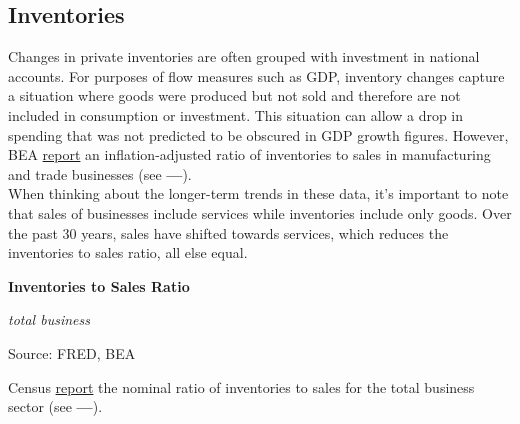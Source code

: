 \documentclass{report}
\makeatletter
\newcommand{\tbllink}[1]{\href{https://raw.githubusercontent.com/bdecon/US-chartbook/master/chartbook/data/#1}{\faTable}}
\newcommand*\short[1]{\expandafter\@gobbletwo\number\numexpr#1\relax}
\newcommand{\shdateaxisticks}{
		date coordinates in=x, axis line style={draw=none},
		xmax={2020-11-15},
		max space between ticks=40,	    
		xtick={{1990-01-01}, {1995-01-01}, {2000-01-01}, 
			{2005-01-01}, {2010-01-01}, {2015-01-01}, {2020-01-01}},
		minor xtick={},
		enlarge y limits={0.06}, enlarge x limits={0.01},
		}
\newcommand{\stdline}[4]{\addplot[very thick, no markers, color=#1] 
		table [x=#2, y=#3, col sep=comma] {#4};	}
\newcommand{\rbars}{
		\fill[color=black!10] (axis cs:{1990-07-01},\pgfkeysvalueof{/pgfplots/ymin}) rectangle 
			(axis cs:{1991-03-01}, \pgfkeysvalueof{/pgfplots/ymax});
		\fill[color=black!10] (axis cs:{2007-12-01},\pgfkeysvalueof{/pgfplots/ymin}) rectangle 
			(axis cs:{2009-07-01}, \pgfkeysvalueof{/pgfplots/ymax});
		\fill[color=black!10] (axis cs:{2001-03-01},\pgfkeysvalueof{/pgfplots/ymin}) rectangle 
			(axis cs:{2001-11-01}, \pgfkeysvalueof{/pgfplots/ymax});
		\fill[color=black!10] (axis cs:{2020-02-01},\pgfkeysvalueof{/pgfplots/ymin}) rectangle 
			(axis cs:{2020-10-01}, \pgfkeysvalueof{/pgfplots/ymax});}
\makeatother
\begin{document}
{{{{\subsection*{\color{black!70} \seriffont Inventories}
\begin{minipage}{0.76\textwidth}
\small Changes in private inventories are often grouped with investment in national accounts. For purposes of flow measures such as GDP, inventory changes capture a situation where goods were produced but not sold and therefore are not included in consumption or investment. This situation can allow a drop in spending that was not predicted to be obscured in GDP growth figures. However, BEA \href{https://apps.bea.gov/iTable/index_UD.cfm}{report} an inflation-adjusted ratio of inventories to sales in manufacturing and trade businesses (see {\color{blue!60!green}\textbf{---}}). \\

When thinking about the longer-term trends in these data, it's important to note that sales of businesses include services while inventories include only goods. Over the past 30 years, sales have shifted towards services, which reduces the inventories to sales ratio, all else equal. 

\end{minipage}
\vspace{1mm}

\begin{minipage}{0.4\textwidth}
\normalsize \textbf{Inventories to Sales Ratio}

\footnotesize{\textit{total business}}
 
\hspace*{-2mm} 

\footnotesize{Source: FRED, BEA} \hfill \tbllink{isratio.csv}

\end{minipage} \hspace{8mm}
\begin{minipage}{0.31\textwidth}
\small Census \href{https://www.census.gov/mtis/www/data/pdf/mtis_current.pdf}{report} the nominal ratio of inventories to sales for the total business sector (see {\color{blue!40!cyan!80!white}\textbf{---}}). 
\end{minipage}



}}}}
\end{document}
